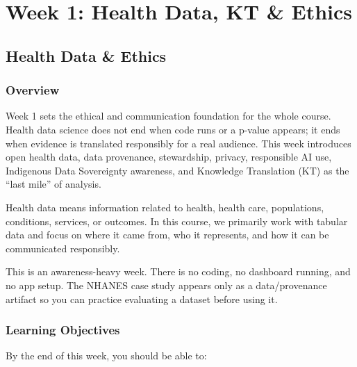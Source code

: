 \documentclass[
  letterpaper,
  DIV=11,
  numbers=noendperiod,
  oneside]{scrreprt}
\begin{document}
\part{Week 1: Health Data, KT \& Ethics}

\chapter*{Health Data \& Ethics}\label{health-data-ethics}


\section*{Overview}\label{overview}


Week 1 sets the ethical and communication foundation for the whole
course. Health data science does not end when code runs or a p-value
appears; it ends when evidence is translated responsibly for a real
audience. This week introduces open health data, data provenance,
stewardship, privacy, responsible AI use, Indigenous Data Sovereignty
awareness, and Knowledge Translation (KT) as the ``last mile'' of
analysis.

Health data means information related to health, health care,
populations, conditions, services, or outcomes. In this course, we
primarily work with tabular data and focus on where it came from, who it
represents, and how it can be communicated responsibly.

This is an awareness-heavy week. There is no coding, no dashboard
running, and no app setup. The NHANES case study appears only as a
data/provenance artifact so you can practice evaluating a dataset before
using it.

\section*{Learning Objectives}\label{learning-objectives}


By the end of this week, you should be able to:
\end{document}
